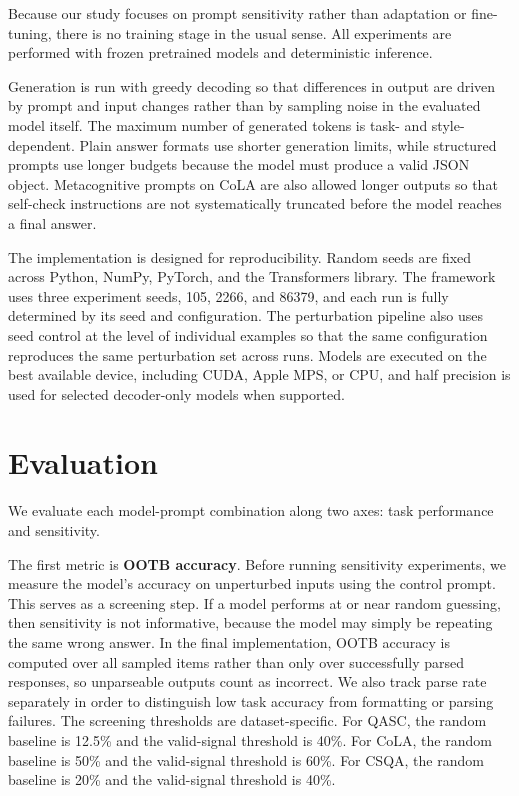 \documentclass[11pt]{article}
\begin{document}
Because our study focuses on prompt sensitivity rather than adaptation or fine-tuning, there is no training stage in the usual sense. All experiments are performed with frozen pretrained models and deterministic inference.

Generation is run with greedy decoding so that differences in output are driven by prompt and input changes rather than by sampling noise in the evaluated model itself. The maximum number of generated tokens is task- and style-dependent. Plain answer formats use shorter generation limits, while structured prompts use longer budgets because the model must produce a valid JSON object. Metacognitive prompts on CoLA are also allowed longer outputs so that self-check instructions are not systematically truncated before the model reaches a final answer.

The implementation is designed for reproducibility. Random seeds are fixed across Python, NumPy, PyTorch, and the Transformers library. The framework uses three experiment seeds, 105, 2266, and 86379, and each run is fully determined by its seed and configuration. The perturbation pipeline also uses seed control at the level of individual examples so that the same configuration reproduces the same perturbation set across runs. Models are executed on the best available device, including CUDA, Apple MPS, or CPU, and half precision is used for selected decoder-only models when supported.

\section{Evaluation}

We evaluate each model-prompt combination along two axes: task performance and sensitivity.

The first metric is \textbf{OOTB accuracy}. Before running sensitivity experiments, we measure the model's accuracy on unperturbed inputs using the control prompt. This serves as a screening step. If a model performs at or near random guessing, then sensitivity is not informative, because the model may simply be repeating the same wrong answer. In the final implementation, OOTB accuracy is computed over all sampled items rather than only over successfully parsed responses, so unparseable outputs count as incorrect. We also track parse rate separately in order to distinguish low task accuracy from formatting or parsing failures. The screening thresholds are dataset-specific. For QASC, the random baseline is 12.5\% and the valid-signal threshold is 40\%. For CoLA, the random baseline is 50\% and the valid-signal threshold is 60\%. For CSQA, the random baseline is 20\% and the valid-signal threshold is 40\%.
\end{document}
